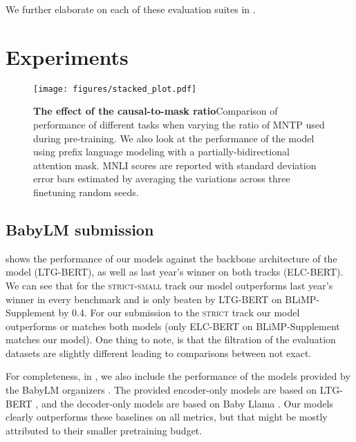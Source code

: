 \noindent
We further elaborate on each of these evaluation suites in .

\section{Experiments}
\label{sec:experiments}

\begin{figure*}[!h]
    \centering
    \texttt{[image: figures/stacked\_plot.pdf]}
    \caption{\textbf{The effect of the causal-to-mask ratio}\hspace{1.5em}Comparison of performance of different tasks when varying the ratio of MNTP used during pre-training. We also look at the performance of the model using prefix language modeling with a partially-bidirectional attention mask. MNLI scores are reported with standard deviation error bars estimated by averaging the variations across three finetuning random seeds.}
    \label{fig:lambada}
\end{figure*}

\subsection{BabyLM submission}

 shows the performance of our models against the backbone architecture of the model (LTG-BERT), as well as last year's winner on both tracks (ELC-BERT). %
We can see that for the \textsc{strict-small} track our model outperforms last year's winner in every benchmark and is only beaten by LTG-BERT on BLiMP-Supplement by 0.4. For our submission to the \textsc{strict} track our model outperforms or matches both models (only ELC-BERT on BLiMP-Supplement matches our model). One thing to note, is that the filtration of the evaluation datasets are slightly different leading to comparisons between not exact.

For completeness, in , we also include the performance of the models provided by the BabyLM organizers  \citep{babylm-2024}. The provided encoder-only models are based on LTG-BERT \citep{samuel-etal-2023-trained}, and the decoder-only models are based on Baby Llama \citep{timiryasov-tastet-2023-baby}. Our models clearly outperforms these baselines on all metrics, but that might be mostly attributed to their smaller pretraining budget.


